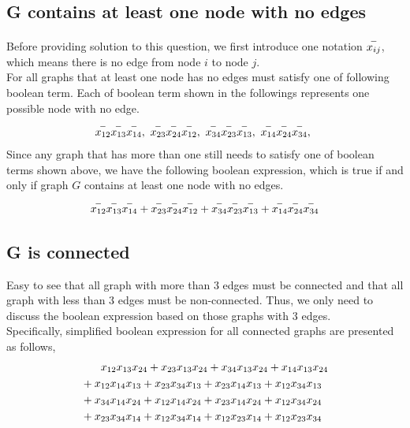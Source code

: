 \documentclass[11pt,a4paper]{article}
\newcommand{\htab}{\hspace*{0.63cm}}
\begin{document}
\subsection{G contains at least one node with no edges}
\htab Before providing solution to this question, we first introduce one notation $\overset{-}{x_{ij}}$, which
means there is no edge from node $i$ to node $j$. \\
\htab For all graphs that at least one node has no edges must satisfy one of following boolean term. 
Each of boolean term shown in the followings represents one possible node with no edge.
\begin{equation}
\begin{aligned}
    \n{12}\n{13}\n{14} ,\ 
    \n{23}\n{24}\n{12} ,\ 
    \n{34}\n{23}\n{13} ,\ 
    \n{14}\n{24}\n{34} ,\ 
\end{aligned}
\end{equation}
\htab Since any graph that has more than one still needs to satisfy one of boolean terms shown above,
we have the following boolean expression, which is true if and only if graph $G$ contains at least
one node with no edges.
\begin{equation}
\begin{aligned}
    \overset{-}{x_{12}}\overset{-}{x_{13}}\overset{-}{x_{14}} + 
    \overset{-}{x_{23}}\overset{-}{x_{24}}\overset{-}{x_{12}} + 
    \overset{-}{x_{34}}\overset{-}{x_{23}}\overset{-}{x_{13}} + 
    \overset{-}{x_{14}}\overset{-}{x_{24}}\overset{-}{x_{34}}  
\end{aligned}
\end{equation}
\subsection{G is connected}
\htab Easy to see that all graph with more than $3$ edges must be connected and that all graph with less
than $3$ edges must be non-connected. Thus, we only need to discuss the boolean expression
based on those graphs with $3$ edges. \\
\htab Specifically, simplified boolean expression for all connected graphs are presented as follows,
\begin{equation}
\begin{aligned} 
    &\htab 
    \x{12}\x{13}\x{24} +
    \x{23}\x{13}\x{24} +
    \x{34}\x{13}\x{24} +
    \x{14}\x{13}\x{24} \\&+
    \x{12}\x{14}\x{13} +
    \x{23}\x{34}\x{13} +
    \x{23}\x{14}\x{13} +
    \x{12}\x{34}\x{13} \\&+
    \x{34}\x{14}\x{24} +
    \x{12}\x{14}\x{24} + 
    \x{23}\x{14}\x{24} +
    \x{12}\x{34}\x{24} \\&+
    \x{23}\x{34}\x{14} +
    \x{12}\x{34}\x{14} +
    \x{12}\x{23}\x{14} +
    \x{12}\x{23}\x{34}
\end{aligned}
\end{equation}
\newpage
\newcommand{\NP}{\mathcal{NP}}
\end{document}
